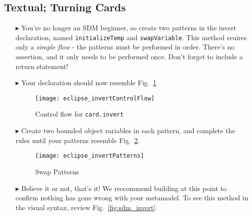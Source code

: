 \newpage
\subsection{Textual; Turning Cards}
\texHeader
\hypertarget{invertCard tex}{}

\begin{itemize}

\item[$\blacktriangleright$] You're no longer an SDM beginner, so create two patterns in the invert declaration, named \texttt{initializeTemp} and
\texttt{swapVariable}. This method reuires only a \emph{simple flow} - the patterns must be performed in order. There's no
assertion, and it only needs to be performed once. Don't forget to include a return statement!

\item[$\blacktriangleright$] Your declaration should now resemble Fig.~\ref{fig:eclipse_invert}

\begin{figure}[htbp]
\begin{center}
  \texttt{[image: eclipse\_invertControlFlow]}
  \caption{Control flow for \texttt{card.invert}}  
  \label{fig:eclipse_invert}
\end{center}
\end{figure}

\item[$\blacktriangleright$] Create two bounded object variables in each pattern, and complete the rules until your patterns resemble
Fig.~\ref{fig:invertPatterns}.

\begin{figure}[htbp]
\begin{center}
  \texttt{[image: eclipse\_invertPatterns]}
  \caption{Swap Patterns}  
  \label{fig:invertPatterns}
\end{center}
\end{figure}

\item[$\blacktriangleright$] Believe it or not, that's it! We reccommend building at this point to confirm nothing has gone wrong with your metamodel. To
see this method in the visual syntax, review Fig.~\ref{fig:sdm_invert}.

\end{itemize}

